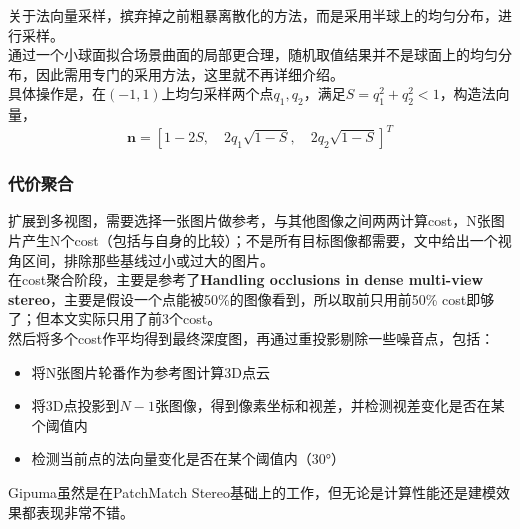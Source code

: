 关于法向量采样，摈弃掉之前粗暴离散化的方法，而是采用半球上的均匀分布，进行采样。\\

通过一个小球面拟合场景曲面的局部更合理，随机取值结果并不是球面上的均匀分布，因此需用专门的采用方法，这里就不再详细介绍。\\

具体操作是，在$(-1,1)$上均匀采样两个点$q_1,q_2$，满足$S = q_1^2 + q_2^2 < 1$，构造法向量，
$$
	\mathbf{n} = \left[1-2S, \quad 2q_1\sqrt{1-S},\quad 2q_2\sqrt{1-S}\right]^T
$$

\subsubsection*{代价聚合}
扩展到多视图，需要选择一张图片做参考，与其他图像之间两两计算cost，N张图片产生N个cost（包括与自身的比较）；不是所有目标图像都需要，文中给出一个视角区间，排除那些基线过小或过大的图片。\\

在cost聚合阶段，主要是参考了\textbf{Handling occlusions in dense multi-view stereo}，主要是假设一个点能被50\%的图像看到，所以取前只用前50\% cost即够了；但本文实际只用了前3个cost。\\

然后将多个cost作平均得到最终深度图，再通过重投影剔除一些噪音点，包括：
\begin{itemize}
	\item 将N张图片轮番作为参考图计算3D点云
	\item 将3D点投影到$N-1$张图像，得到像素坐标和视差，并检测视差变化是否在某个阈值内
	\item 检测当前点的法向量变化是否在某个阈值内（30°）
\end{itemize}

Gipuma虽然是在PatchMatch Stereo基础上的工作，但无论是计算性能还是建模效果都表现非常不错。
